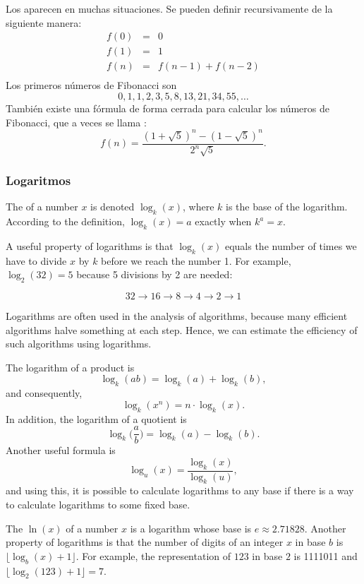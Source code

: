 
Los 
aparecen en muchas situaciones.
Se pueden definir recursivamente de la siguiente manera:
\[
\begin{array}{lcl}
f(0) & = & 0 \\
f(1) & = & 1 \\
f(n) & = & f(n-1)+f(n-2) \\
\end{array}
\]
Los primeros números de Fibonacci son
\[0, 1, 1, 2, 3, 5, 8, 13, 21, 34, 55, \ldots\]
También existe una fórmula de forma cerrada
para calcular los números de Fibonacci, que a veces se llama
 :
\[f(n)=\frac{(1 + \sqrt{5})^n - (1-\sqrt{5})^n}{2^n \sqrt{5}}.\]

\subsubsection{Logaritmos}


The  of a number $x$
is denoted $\log_k(x)$, where $k$ is the base
of the logarithm.
According to the definition,
$\log_k(x)=a$ exactly when $k^a=x$.

A useful property of logarithms is
that $\log_k(x)$ equals the number of times
we have to divide $x$ by $k$ before we reach 
the number 1.
For example, $\log_2(32)=5$
because 5 divisions by 2 are needed:

\[32 \rightarrow 16 \rightarrow 8 \rightarrow 4 \rightarrow 2 \rightarrow 1 \]

Logarithms are often used in the analysis of
algorithms, because many efficient algorithms
halve something at each step.
Hence, we can estimate the efficiency of such algorithms
using logarithms.

The logarithm of a product is
\[\log_k(ab) = \log_k(a)+\log_k(b),\]
and consequently,
\[\log_k(x^n) = n \cdot \log_k(x).\]
In addition, the logarithm of a quotient is
\[\log_k\Big(\frac{a}{b}\Big) = \log_k(a)-\log_k(b).\]
Another useful formula is
\[\log_u(x) = \frac{\log_k(x)}{\log_k(u)},\]
and using this, it is possible to calculate
logarithms to any base if there is a way to
calculate logarithms to some fixed base.


The  $\ln(x)$ of a number $x$
is a logarithm whose base is $e \approx 2.71828$.
Another property of logarithms is that
the number of digits of an integer $x$ in base $b$ is
$\lfloor \log_b(x)+1 \rfloor$.
For example, the representation of
$123$ in base $2$ is 1111011 and
$\lfloor \log_2(123)+1 \rfloor = 7$.

